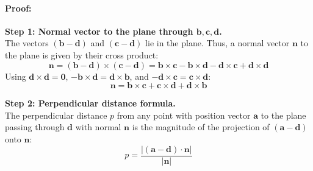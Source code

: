 \documentclass[11pt,a4paper]{article}
\begin{document}
\paragraph{Proof:}
\textbf{Step 1: Normal vector to the plane through $\mathbf{b}, \mathbf{c}, \mathbf{d}$.}\\
The vectors $(\mathbf{b} - \mathbf{d})$ and $(\mathbf{c} - \mathbf{d})$ lie in the plane. Thus, a normal vector $\mathbf{n}$ to the plane is given by their cross product:
$$\mathbf{n} = (\mathbf{b} - \mathbf{d}) \times (\mathbf{c} - \mathbf{d}) = \mathbf{b}\times\mathbf{c} - \mathbf{b}\times\mathbf{d} - \mathbf{d}\times\mathbf{c} + \mathbf{d}\times\mathbf{d}$$
Using $\mathbf{d}\times\mathbf{d} = \mathbf{0}$, $-\mathbf{b}\times\mathbf{d} = \mathbf{d}\times\mathbf{b}$, and $-\mathbf{d}\times\mathbf{c} = \mathbf{c}\times\mathbf{d}$:
$$\mathbf{n} = \mathbf{b}\times\mathbf{c} + \mathbf{c}\times\mathbf{d} + \mathbf{d}\times\mathbf{b}$$

\textbf{Step 2: Perpendicular distance formula.}\\
The perpendicular distance $p$ from any point with position vector $\mathbf{a}$ to the plane passing through $\mathbf{d}$ with normal $\mathbf{n}$ is the magnitude of the projection of $(\mathbf{a} - \mathbf{d})$ onto $\mathbf{n}$:
$$p = \frac{|(\mathbf{a} - \mathbf{d}) \cdot \mathbf{n}|}{|\mathbf{n}|}$$
\end{document}
